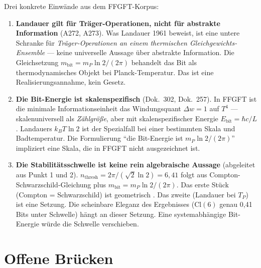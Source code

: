 Drei konkrete Einwände aus dem FFGFT-Korpus:

\begin{enumerate}

\item \textbf{Landauer gilt für Träger-Operationen, nicht für abstrakte Information}
  (A272, A273).
  Was Landauer 1961 beweist, ist eine untere Schranke für
  \emph{Träger-Operationen an einem thermischen Gleichgewichts-Ensemble} —
  keine universelle Aussage über abstrakte Information.
  Die Gleichsetzung $m_{\mathrm{bit}} = m_P\ln 2/(2\pi)$ behandelt das Bit als
  thermodynamisches Objekt bei Planck-Temperatur.
  Das ist eine Realisierungsannahme, kein Gesetz.

\item \textbf{Die Bit-Energie ist skalenspezifisch} (Dok.\ 302, Dok.\ 257).
  In FFGFT ist die minimale Informationseinheit das Windungsquant $\Delta w = 1$ auf $T^4$
  — skalenuniversell als \emph{Zählgröße},
  aber mit skalenspezifischer Energie $E_{\mathrm{bit}} = \hbar c/L$.
  Landauers $k_BT\ln 2$ ist der Spezialfall bei einer bestimmten Skala und Badtemperatur.
  Die Formulierung \enquote{die Bit-Energie ist $m_P\ln 2/(2\pi)$}
  impliziert eine Skala, die in FFGFT nicht ausgezeichnet ist.

\item \textbf{Die Stabilitätsschwelle ist keine rein algebraische Aussage}
  (abgeleitet aus Punkt 1 und 2).
  $n_{\mathrm{thresh}} = 2\pi/(\sqrt{2}\ln 2) = 6{,}41$ folgt aus
  Compton-Schwarzschild-Gleichung plus $m_{\mathrm{bit}} = m_P\ln 2/(2\pi)$.
  Das erste Stück (Compton = Schwarzschild) ist geometrisch \B.
  Das zweite (Landauer bei $T_P$) ist eine Setzung.
  Die scheinbare Eleganz des Ergebnisses ($\mathrm{Cl}(6)$ genau 0{,}41 Bits unter Schwelle)
  hängt an dieser Setzung.
  Eine systemabhängige Bit-Energie würde die Schwelle verschieben.

\end{enumerate}

\section{Offene Brücken}

